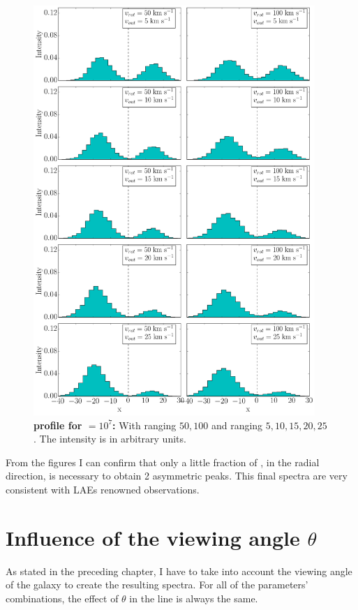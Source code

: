 \begin{figure}[h!]
	\begin{center}
		\includegraphics[width=0.95\textwidth]{./figures/chapter3/3_tau10E7_phi83-90}
	\end{center}
	\caption{\textbf{\lya profile for \tauh$=10^7$:} With \vrot ranging $50,100$ \kms and \vout ranging $5,10,15,20,25$ \kms. The intensity is in arbitrary units.
		\label{fig:3_tau10E7_phi83-90}}
\end{figure}

\newpage

From the figures I can confirm that only a little fraction of \vrot, in the radial direction, is necessary to obtain 2 asymmetric peaks. This final spectra are very consistent with LAEs renowned observations.  \\


\section{Influence of the viewing angle $\theta$}
As stated in the preceding chapter, I have to take into account the viewing angle of the galaxy to create the resulting spectra. For all of the parameters' combinations, the effect of $\theta$ in the \lya line is always the same.\\

